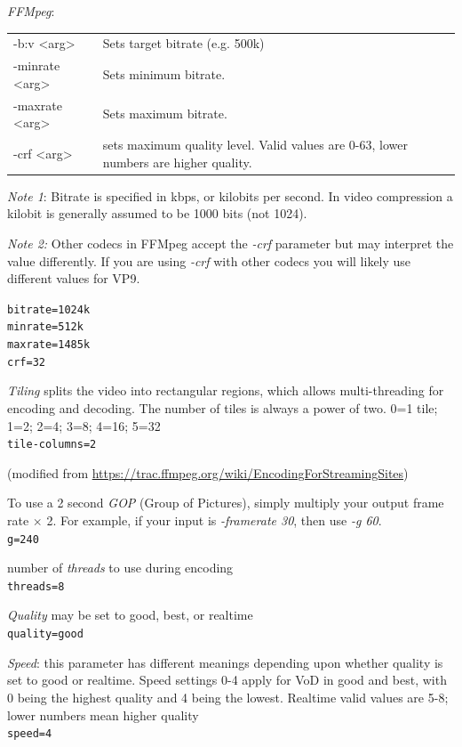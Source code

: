 \textit{FFMpeg}:

\begin{center}
	\begin{tabular}{p{4cm}p{10cm}}
		\hline
		-b:v <arg> & Sets target bitrate (e.g. 500k)\\
		-minrate <arg> & Sets minimum bitrate.\\
		-maxrate <arg> & Sets maximum bitrate.\\
		-crf <arg> & sets maximum quality level. Valid values are 0-63, lower numbers are higher quality.\\
		\hline
	\end{tabular}
\end{center}

\textit{Note 1}: Bitrate is specified in kbps, or kilobits per second. In video compression a kilobit is generally assumed to be 1000 bits (not 1024).

\textit{Note 2:} Other codecs in FFMpeg accept the \textit{-crf} parameter but may interpret the value differently. If you are using \textit{-crf} with other codecs you will likely use different values for VP9.

\texttt{bitrate=1024k}\\
\texttt{minrate=512k}\\
\texttt{maxrate=1485k}\\
\texttt{crf=32}

\textit{Tiling} splits the video into rectangular regions, which allows multi-threading for encoding and decoding. The number of tiles is always a power of two. 0=1 tile; 1=2; 2=4; 3=8; 4=16; 5=32\\
\texttt{tile-columns=2}

(modified from {\small \url{https://trac.ffmpeg.org/wiki/EncodingForStreamingSites}})

To use a 2 second \textit{GOP} (Group of Pictures), simply multiply your output frame rate $\times$ 2. For example, if your input is \textit{-framerate 30}, then use \textit{-g 60}.\\
\texttt{g=240}

number of \textit{threads} to use during encoding\\
\texttt{threads=8}

\textit{Quality} may be set to good, best, or realtime\\
\texttt{quality=good}

\textit{Speed}: this parameter has different meanings depending upon whether quality is set to good or realtime. Speed settings 0-4 apply for VoD in good and best, with 0 being the highest quality and 4 being the lowest. Realtime valid values are 5-8; lower numbers mean higher quality\\
\texttt{speed=4}

